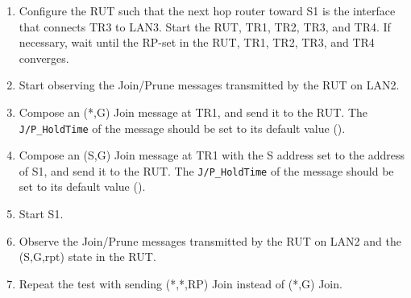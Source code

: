 \documentclass[11pt]{report}
\begin{document}
\begin{enumerate}

  \item Configure the RUT such that the next hop router toward S1 is
  the interface that connects TR3 to LAN3. Start the RUT, TR1, TR2, TR3, and
  TR4. If necessary, wait until the RP-set in the RUT, TR1, TR2, TR3, and TR4
  converges.

  \item Start observing the Join/Prune messages transmitted by the RUT on
  LAN2.

  \item Compose an (*,G) Join message at TR1, and send it to the RUT.
  The \verb=J/P_HoldTime= of the message should be set to its default
  value ({\PimsmJPHoldTime}).

  \item Compose an (S,G) Join message at TR1 with the S address set to the
  address of S1, and send it to the RUT. 
  The \verb=J/P_HoldTime= of the message should be set to its default
  value ({\PimsmJPHoldTime}).

  \item Start S1.

  \item Observe the Join/Prune messages transmitted by the RUT on LAN2 and the
  (S,G,rpt) state in the RUT.

  \item Repeat the test with sending (*,*,RP) Join instead of (*,G) Join.

\end{enumerate}

\end{document}

